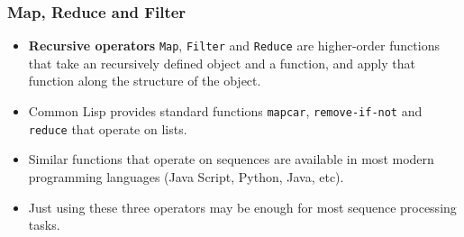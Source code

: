 \documentclass{beamer}
\begin{document}
  

\begin{frame}[fragile]
  \frametitle{Map, Reduce and Filter}
  \begin{itemize}
  \item \textbf{Recursive operators} \texttt{Map},
    \texttt{Filter} and \texttt{Reduce} are higher-order
    functions that take an recursively defined object and a function, and apply
    that function along the structure of the object.
  \item Common Lisp provides standard functions \texttt{mapcar},
    \texttt{remove-if-not} and \texttt{reduce} that operate
    on lists.
  \item Similar functions that operate on sequences are available in most modern
    programming languages (Java Script, Python, Java, etc).
  \item Just using these three operators may be enough for most sequence
    processing tasks.
  \end{itemize}
\end{frame}
\end{document}
